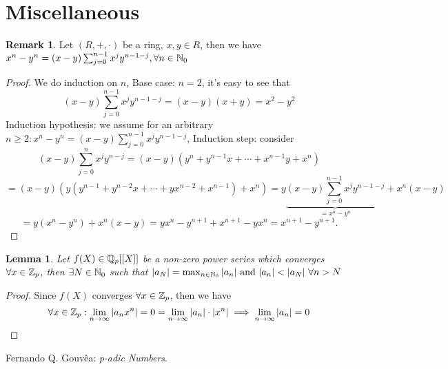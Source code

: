 \documentclass[a4paper]{article}
\theoremstyle{plain}
\newtheorem{lemm}[thm]{Lemma}
\theoremstyle{definition}
\newtheorem{rem}[thm]{Remark}
\begin{document}
\section{Miscellaneous}
\begin{rem} %
  Let $(R, +, \cdot)$ be a ring, $x, y \in R$, then we have $x^{n}-y^{n} = (x-y)\sum_{j=0}^{n-1}x^{j}y^{n-1-j}, \forall n \in \Bbb N_{0}$
\end{rem}
\begin{proof} %
  We do induction on $n$,
  Base case: $n = 2$, it's easy to see that
  $$(x-y)\sum_{j=0}^{n-1}x^{j}y^{n-1-j} = (x-y)(x+y) = x^{2} - y^{2}$$
  Induction hypothesis: we assume for an arbitrary $n \geq 2: x^{n}-y^{n} = (x-y)\sum_{j=0}^{n-1}x^{j}y^{n-1-j}$,
  Induction step: consider
  $$(x-y)\sum_{j=0}^{n}x^{j}y^{n-j} = (x-y)(y^{n} + y^{n-1}x + \cdots + x^{n-1}y + x^{n})$$
  $$ = (x-y)(y(y^{n-1} + y^{n-2}x + \cdots + yx^{n-2} + x^{n-1}) + x^{n}) = y\underbrace{(x-y)\sum_{j=0}^{n-1}x^{j}y^{n-1-j}}_{= x^{n}-y^{n}} + x^{n}(x-y)$$
  $$ = y(x^{n} - y^{n}) + x^{n}(x-y) = yx^{n} - y^{n+1} + x^{n+1} - yx^{n} = x^{n+1} - y^{n+1}.$$
\end{proof}
\begin{lemm}
  Let $f(X) \in \Bbb Q_{p}[[X]]$ be a non-zero power series which converges $\forall x \in \Bbb Z_{p}$, then $\exists N \in \Bbb N_{0}$ such that $|a_{N}| = \max_{n \in \Bbb N_{0}}|a_{n}| \text{ and } |a_{n}| < |a_{N}|\ \forall n > N$
\end{lemm}
\begin{proof}
  Since $f(X)$ converges $\forall x \in \Bbb Z_{p}$, then we have
  $$\forall x \in \Bbb Z_{p} : \lim_{n \to \infty}|a_{n}x^{n}| = 0 = \lim_{n \to \infty}|a_{n}|\cdot|x^{n}| \implies \lim_{n \to \infty}|a_{n}| = 0$$
\end{proof}
\begin{thebibliography}{widest-label} %

	Fernando Q. Gouv\^{e}a:
	\emph{p-adic Numbers}.


\end{thebibliography}
\end{document}
